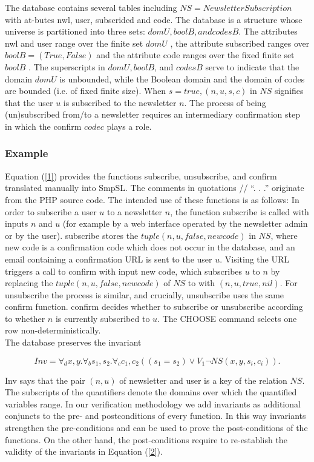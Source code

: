 \documentclass[12pt]{acmart}
\begin{document}
The database contains several tables including $NS = NewsletterSubscription$ with at-butes nwl, user, subscrided and code. The database is a structure whose universe is partitioned into three sets: $domU, boolB, and codesB$. The attributes nwl and user range over the finite set $domU$  , the attribute subscribed ranges over $boolB =  (True, False)$ and the attribute code ranges over the fixed finite set $boolB$ . The superscripts in $domU, boolB$, and $codesB$ serve to indicate that the domain $domU$ is unbounded, while the Boolean domain and the domain of codes are bounded (i.e. of fixed finite size). When $s=true, (n,u,s,c )$ in $NS$ signifies that the user $u$ is subscribed to the newsletter $n$. The process of being (un)subscribed from/to a newsletter requires an intermediary confirmation step in which the confirm $code c$ plays a role. 

\subsubsection{Example}

Equation (\ref{1}) provides the functions subscribe, unsubscribe, and confirm translated manually into SmpSL. The comments in quotations // “. . .” originate from the PHP source code. The intended use of these functions is as follows: In order to subscribe a user $u$ to a newsletter $n$, the function subscribe is called with inputs $n$ and $u$ (for example by a web interface operated by the newsletter admin or by the user). subscribe stores the $tuple(n,u,false,new code)$ in $NS$, where new code is a confirmation code which does not occur in the database, and an email containing a confirmation URL is sent to the user $u$. Visiting the URL triggers a call to confirm with input new code, which subscribes $u$ to $n$ by replacing the $tuple(n,u,false,new code)$ of $NS$ to with $(n,u,true,nil)$. For unsubscribe the process is similar, and crucially, unsubscribe uses the same confirm function. confirm decides whether to subscribe or unsubscribe according to whether $n$ is currently subscribed to $u$. The CHOOSE command selects one row non-deterministically.\\
The database preserves the invariant

\begin{equation}
    Inv = \forall_d x,y.\forall_b s_1,s_2.\forall_c c_1,c_2 ((s_1=s_2 )\vee V_1 \neg NS(x,y,s_i,c_i )).
    \label{1}
\end{equation}

 Inv says that the pair $(n, u)$ of newsletter and user is a key of the relation $NS$. The subscripts of the quantifiers denote the domains over which the quantified variables range. In our verification methodology we add invariants as additional conjuncts to the pre- and postconditions of every function. In this way invariants strengthen the pre-conditions and can be used to prove the post-conditions of the functions. On the other hand, the post-conditions require to re-establish the validity of the invariants in Equation (\ref{2}).
\end{document}
